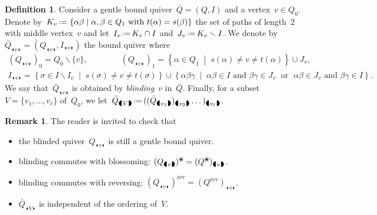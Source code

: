 \documentclass{amsart}
\theoremstyle{definition}
\newtheorem{definition}[theorem]{Definition}
\newtheorem{remark}[theorem]{Remark}
\newcommand{\set}[2]{\left\{ #1 \;\middle|\; #2 \right\}} %
\newcommand{\ssm}{\smallsetminus} %
\newcommand{\eqdef}{\mbox{\,\raisebox{0.2ex}{\scriptsize\ensuremath{\mathrm:}}\ensuremath{=}\,}} %
\newcommand{\darkblue}{\color{darkblue}} %
\newcommand{\defn}[1]{\textsl{\darkblue #1}} %
\newcommand{\blossom}{^\text{\ding{96}}} %
\newcommand{\blinkers}[1]{_{\LEFTCIRCLE \!\! #1 \!\! \RIGHTCIRCLE}} %
\newcommand{\reversed}[1]{#1^{\mathrm{rev}}} %
\begin{document}
\begin{definition}
Consider a gentle bound quiver~$\bar Q = (Q,I)$ and a vertex~$v \in Q_0$.
Denote by~$K_v \eqdef \set{\alpha\beta}{\alpha, \beta \in Q_1 \text{ with } t(\alpha) = s(\beta)}$ the set of paths of length~$2$ with middle vertex~$v$ and let~$I_v \eqdef K_v \cap I$ and~$J_v \eqdef K_v \ssm I$.
We denote by~$\bar Q\blinkers{v} = (Q\blinkers{v}, I\blinkers{v})$ the bound quiver where
\begin{gather*}
(Q\blinkers{v})_0 = Q_0 \ssm \{v\},
\qquad\qquad
(Q\blinkers{v})_1 = \set{\alpha \in Q_1}{s(\alpha) \ne v \ne t(\alpha) } \cup J_v,
\\
I\blinkers{v} = \set{\sigma \in I \ssm I_v}{s(\sigma) \ne v \ne t(\sigma)} \cup \set{\alpha\beta\gamma}{\alpha\beta \in I \text{ and } \beta\gamma \in J_v \; \text{ or } \; \alpha\beta \in J_v \text{ and } \beta\gamma \in I}.
\end{gather*}
We say that~$\bar Q\blinkers{v}$ is obtained by \defn{blinding}~$v$ in~$\bar Q$.
Finally, for a subset~$V = \{v_1, \dots, v_\ell\}$ of~$Q_0$, we let~$\bar Q\blinkers{V} \eqdef ((\bar Q\blinkers{v_1})\blinkers{v_2} \dots )\blinkers{v_\ell}$.
\end{definition}

\begin{remark}
The reader is invited to check that
\begin{itemize}
\item the blinded quiver~$Q\blinkers{v}$ is still a gentle bound quiver.
\item blinding commutes with blossoming: $(Q\blinkers{v})\blossom = (Q\blossom)\blinkers{v}$.
\item blinding commutes with reversing: $\reversed{(Q\blinkers{v})} = (\reversed{Q})\blinkers{v}$.
\item $\bar Q\blinkers{V}$ is independent of the ordering of~$V$.
\end{itemize}
\end{remark}
\end{document}
